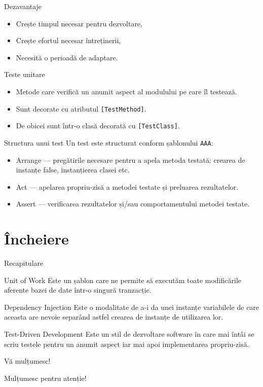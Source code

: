 \documentclass[presentation]{beamer}
\begin{document}
\begin{frame}[label={sec:org3d05dd3}]{Dezavantaje}
\begin{itemize}
\item Crește timpul necesar pentru dezvoltare,
\item Crește efortul necesar întreținerii,
\item Necesită o perioadă de adaptare.
\end{itemize}
\end{frame}
\begin{frame}[label={sec:org3350235},fragile]{Teste unitare}
 \begin{itemize}
\item Metode care verifică un anumit aspect al modulului pe care îl testează.
\item Sunt decorate cu atributul \texttt{[TestMethod]}.
\item De obicei sunt într-o clasă decorată cu \texttt{[TestClass]}.
\end{itemize}
\end{frame}
\begin{frame}[label={sec:orgbfda75b},fragile]{Structura unui test}
 Un test este structurat conform șablonului \texttt{AAA}:
\begin{itemize}
\item \alert{Arrange}  --- pregătirile necesare pentru a apela metoda testată: crearea de instanțe false, instanțierea clasei etc.
\item \alert{Act} --- apelarea propriu-zisă a metodei testate și preluarea rezultatelor.
\item \alert{Assert} --- verificarea rezultatelor și/sau comportamentului metodei testate.
\end{itemize}
\end{frame}
\section{Încheiere}
\label{sec:org986910d}
\begin{frame}[label={sec:org0f54dab}]{Recapitulare}
\pause
\begin{block}{Unit of Work}
\pause
Este un șablon care ne permite să executăm toate modificările aferente bazei de date într-o singură tranzacție.
\pause
\end{block}
\begin{block}{Dependency Injection}
\pause
Este o modalitate de a-i da unei instanțe variabilele de care aceasta are nevoie separând astfel crearea de instanțe de utilizarea lor.
\pause
\end{block}
\begin{block}{Test-Driven Development}
\pause
Este un stil de dezvoltare software în care mai întâi se scriu testele pentru un anumit aspect iar mai apoi implementarea propriu-zisă.
\end{block}
\end{frame}
\begin{frame}[label={sec:orgccb211c}]{Vă mulțumesc!}
\begin{center}
Mulțumesc pentru atenție!
\end{center}
\end{frame}
\end{document}
